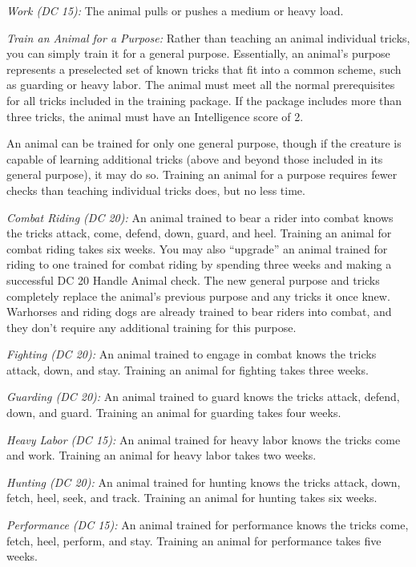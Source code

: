 \emph{Work (DC 15):} The animal pulls or pushes a medium or heavy load.

\textit{Train an Animal for a Purpose:} Rather than teaching an animal individual tricks, you can simply train it for a general purpose. Essentially, an animal's purpose represents a preselected set of known tricks that fit into a common scheme, such as guarding or heavy labor. The animal must meet all the normal prerequisites for all tricks included in the training package. If the package includes more than three tricks, the animal must have an Intelligence score of 2.

An animal can be trained for only one general purpose, though if the creature is capable of learning additional tricks (above and beyond those included in its general purpose), it may do so. Training an animal for a purpose requires fewer checks than teaching individual tricks does, but no less time.

\emph{Combat Riding (DC 20):} An animal trained to bear a rider into combat knows the tricks attack, come, defend, down, guard, and heel. Training an animal for combat riding takes six weeks. You may also ``upgrade'' an animal trained for riding to one trained for combat riding by spending three weeks and making a successful DC 20 Handle Animal check. The new general purpose and tricks completely replace the animal's previous purpose and any tricks it once knew. Warhorses and riding dogs are already trained to bear riders into combat, and they don't require any additional training for this purpose.

\emph{Fighting (DC 20):} An animal trained to engage in combat knows the tricks attack, down, and stay. Training an animal for fighting takes three weeks.

\emph{Guarding (DC 20):} An animal trained to guard knows the tricks attack, defend, down, and guard. Training an animal for guarding takes four weeks.

\emph{Heavy Labor (DC 15):} An animal trained for heavy labor knows the tricks come and work. Training an animal for heavy labor takes two weeks.

\emph{Hunting (DC 20):} An animal trained for hunting knows the tricks attack, down, fetch, heel, seek, and track. Training an animal for hunting takes six weeks.

\emph{Performance (DC 15):} An animal trained for performance knows the tricks come, fetch, heel, perform, and stay. Training an animal for performance takes five weeks.

